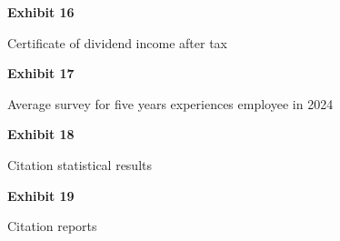 \documentclass{article}
\begin{document}
% 


\vspace*{\fill}
\begin{center}

{\LARGE \bf
Exhibit 16
}

\vspace{10\baselineskip}

{\large  Certificate of dividend income after tax}

\end{center}
\vspace*{\fill}

% 

% 


\vspace*{\fill}
\begin{center}

{\LARGE \bf
Exhibit 17
}

\vspace{10\baselineskip}

{\large Average survey for five years experiences employee in 2024}

\end{center}
\vspace*{\fill}

% 

\vspace*{\fill}
\begin{center}

{\LARGE \bf
Exhibit 18
}

\vspace{10\baselineskip}

{\large Citation statistical results}

\end{center}
\vspace*{\fill}




\vspace*{\fill}
\begin{center}

{\LARGE \bf
Exhibit 19
}

\vspace{10\baselineskip}

{\large Citation reports}

\end{center}
\vspace*{\fill}
\end{document}
